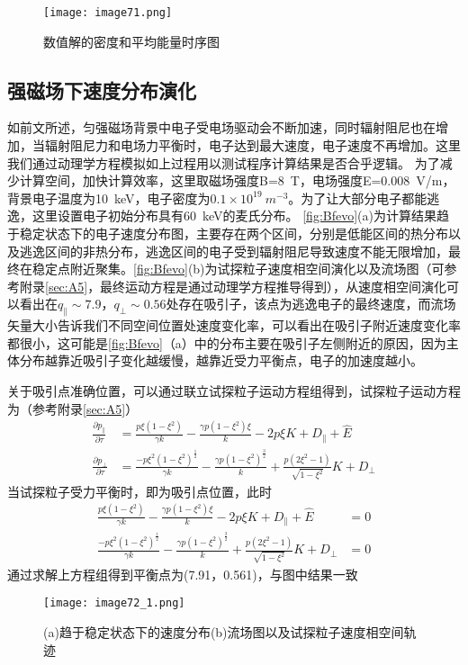 \begin{figure}
\centering
\texttt{[image: image71.png]}
\caption{\label{fig:errornega}数值解的密度和平均能量时序图}
\end{figure}\par

\subsection{强磁场下速度分布演化}

如前文所述，匀强磁场背景中电子受电场驱动会不断加速，同时辐射阻尼也在增加，当辐射阻尼力和电场力平衡时，电子达到最大速度，电子速度不再增加。这里我们通过动理学方程模拟如上过程用以测试程序计算结果是否合乎逻辑。
为了减少计算空间，加快计算效率，这里取磁场强度B=8~T，电场强度E=0.008~V/m，背景电子温度为10~keV，电子密度为$0.1\times10^{19}~m^{-3}$。为了让大部分电子都能逃逸，这里设置电子初始分布具有60~keV的麦氏分布。 \autoref{fig:Bfevo}(a)为计算结果趋于稳定状态下的电子速度分布图，主要存在两个区间，分别是低能区间的热分布以及逃逸区间的非热分布，逃逸区间的电子受到辐射阻尼导致速度不能无限增加，最终在稳定点附近聚集。\autoref{fig:Bfevo}(b)为试探粒子速度相空间演化以及流场图（可参考附录\autoref{sec:A5}，最终运动方程是通过动理学方程推导得到），从速度相空间演化可以看出在$q_∥\sim7.9$，$q_⊥\sim0.56$处存在吸引子，该点为逃逸电子的最终速度，而流场矢量大小告诉我们不同空间位置处速度变化率，可以看出在吸引子附近速度变化率都很小，这可能是\autoref{fig:Bfevo}（a）中的分布主要在吸引子左侧附近的原因，因为主体分布越靠近吸引子变化越缓慢，越靠近受力平衡点，电子的加速度越小。\par

关于吸引点准确位置，可以通过联立试探粒子运动方程组得到，试探粒子运动方程为（参考附录\autoref{sec:A5}）
\begin{align}\frac{\partial p_{\parallel}}{\partial \tau} & = \frac{p \xi\left(1-\xi^{2}\right)}{\gamma k}-\frac{\gamma p\left(1-\xi^{2}\right) \xi}{k}-2 p \xi K+D_{\parallel}+\hat{E} \\\frac{\partial p_{\perp}}{\partial \tau} & = \frac{-p \xi^{2}\left(1-\xi^{2}\right)^{\frac{1}{2}}}{\gamma k}-\frac{\gamma p\left(1-\xi^{2}\right)^{\frac{3}{2}}}{k}+\frac{p\left(2 \xi^{2}-1\right)}{\sqrt{1-\xi^{2}}} K+D_{\perp}\end{align}
当试探粒子受力平衡时，即为吸引点位置，此时
\begin{align}\frac{p \xi\left(1-\xi^{2}\right)}{\gamma k}-\frac{\gamma p\left(1-\xi^{2}\right) \xi}{k}-2 p \xi K+D_{\parallel}+\hat{E} & = 0 \\\frac{-p \xi^{2}\left(1-\xi^{2}\right)^{\frac{1}{2}}}{\gamma k}-\frac{\gamma p\left(1-\xi^{2}\right)^{\frac{3}{2}}}{k}+\frac{p\left(2 \xi^{2}-1\right)}{\sqrt{1-\xi^{2}}} K+D_{\perp} & = 0\end{align}
通过求解上方程组得到平衡点为(7.91，0.561)，与图中结果一致
\begin{figure}[ht]
\centering
\texttt{[image: image72\_1.png]}
\caption{\label{fig:Bfevo}(a)趋于稳定状态下的速度分布(b)流场图以及试探粒子速度相空间轨迹}
\end{figure}

